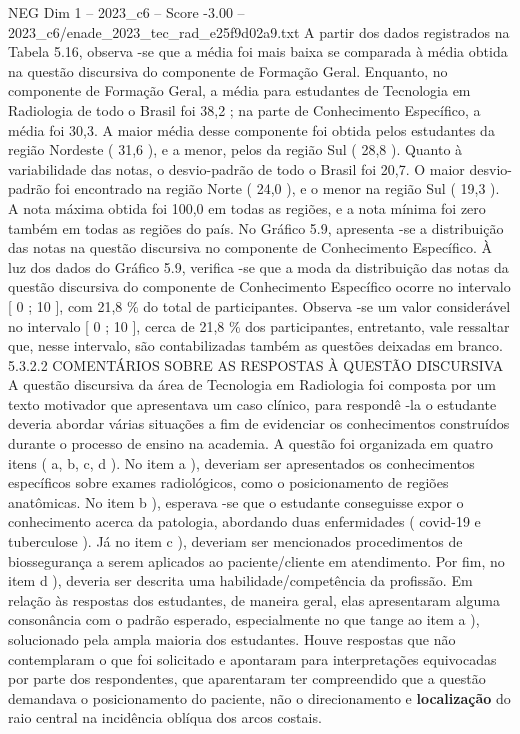 \begin{textsample}{NEG Dim 1 – 2023\_c6 – Score -3.00 – 2023\_c6/enade\_2023\_tec\_rad\_e25f9d02a9.txt}
A partir dos dados registrados na Tabela 5.16, observa -se que a média foi mais baixa se comparada à média obtida na questão discursiva do componente de Formação Geral.
Enquanto, no componente de Formação Geral, a média para estudantes de Tecnologia em Radiologia de todo o Brasil foi 38,2 ; na parte de Conhecimento Específico, a média foi 30,3.
A maior média desse componente foi obtida pelos estudantes da região Nordeste ( 31,6 ), e a menor, pelos da região Sul ( 28,8 ).
Quanto à variabilidade das notas, o desvio-padrão de todo o Brasil foi 20,7.
O maior desvio-padrão foi encontrado na região Norte ( 24,0 ), e o menor na região Sul ( 19,3 ).
A nota máxima obtida foi 100,0 em todas as regiões, e a nota mínima foi zero também em todas as regiões do país.
No Gráfico 5.9, apresenta -se a distribuição das notas na questão discursiva no componente de Conhecimento Específico.
À luz dos dados do Gráfico 5.9, verifica -se que a moda da distribuição das notas da questão discursiva do componente de Conhecimento Específico ocorre no intervalo [ 0 ; 10 ], com 21,8 \% do total de participantes.
Observa -se um valor considerável no intervalo [ 0 ; 10 ], cerca de 21,8 \% dos participantes, entretanto, vale ressaltar que, nesse intervalo, são contabilizadas também as questões deixadas em branco. 5.3.2.2 COMENTÁRIOS SOBRE AS RESPOSTAS À QUESTÃO DISCURSIVA A questão discursiva da área de Tecnologia em Radiologia foi composta por um texto motivador que apresentava um caso clínico, para respondê -la o estudante deveria abordar várias situações a fim de evidenciar os conhecimentos construídos durante o processo de ensino na academia.
A questão foi organizada em quatro itens ( a, b, c, d ).
No item a ), deveriam ser apresentados os conhecimentos específicos sobre exames radiológicos, como o posicionamento de regiões anatômicas.
No item b ), esperava -se que o estudante conseguisse expor o conhecimento acerca da patologia, abordando duas enfermidades ( covid-19 e tuberculose ).
Já no item c ), deveriam ser mencionados procedimentos de biossegurança a serem aplicados ao paciente/cliente em atendimento.
Por fim, no item d ), deveria ser descrita uma habilidade/competência da profissão.
Em relação às respostas dos estudantes, de maneira geral, elas apresentaram alguma consonância com o padrão esperado, especialmente no que tange ao item a ), solucionado pela ampla maioria dos estudantes.
Houve respostas que não contemplaram o que foi solicitado e apontaram para interpretações equivocadas por parte dos respondentes, que aparentaram ter compreendido que a questão demandava o posicionamento do paciente, não o direcionamento e \textbf{localização} do raio central na incidência oblíqua dos arcos costais.

\end{textsample}
